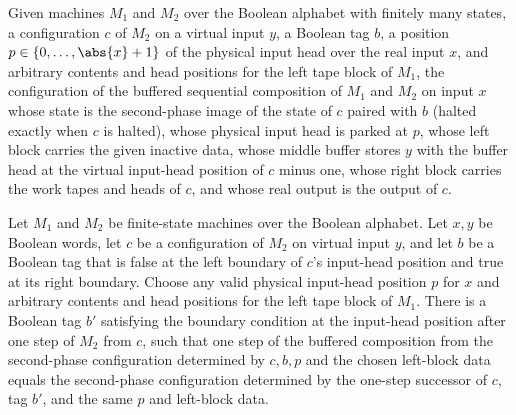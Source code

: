 \begin{definition}
\label{Turing.FinTM.bufferedSecondCfg}
\leanok
{}
Given machines $M_1$ and $M_2$ over the Boolean alphabet with finitely many
states, a configuration $c$ of $M_2$ on a virtual input $y$, a Boolean tag
$b$, a position $p \in \{0,\dots,\abs{x}+1\}$ of the physical input head over
the real input $x$, and arbitrary contents and head positions for the
left tape block of $M_1$, the configuration of the buffered sequential
composition of $M_1$ and $M_2$ on input $x$ whose state is the second-phase
image of the state of $c$ paired with $b$ (halted exactly when $c$ is
halted), whose physical input head is parked at $p$, whose left block carries
the given inactive data, whose middle buffer stores $y$ with the buffer head
at the virtual input-head position of $c$ minus one, whose right block
carries the work tapes and heads of $c$, and whose real output is the output
of $c$.
\end{definition}

\begin{lemma}
\label{Turing.FinTM.bufferedSecondCfg_step}
\leanok
{}
Let $M_1$ and $M_2$ be finite-state machines over the Boolean alphabet. Let $x,y$ be
Boolean words, let $c$ be a configuration of $M_2$ on virtual input $y$, and let $b$ be
a Boolean tag that is false at the left boundary of $c$'s input-head position and true
at its right boundary. Choose any valid physical input-head position $p$ for $x$ and
arbitrary contents and head positions for the left tape block of $M_1$. There is a
Boolean tag $b'$ satisfying the boundary condition at the input-head position after one
step of $M_2$ from $c$, such that one step of the buffered composition from the
second-phase configuration determined by $c,b,p$ and the chosen left-block data equals
the second-phase configuration determined by the one-step successor of $c$, tag $b'$,
and the same $p$ and left-block data.
\end{lemma}

